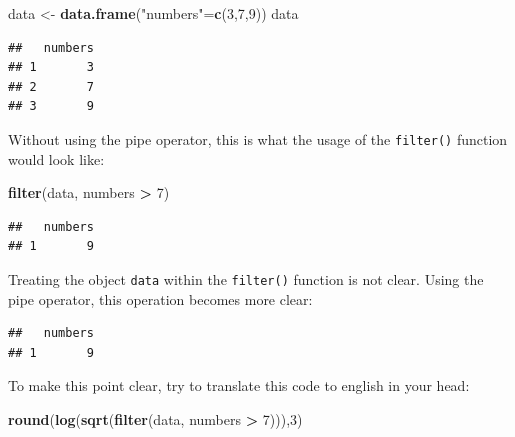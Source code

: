 \documentclass[
]{book}
\newenvironment{Shaded}{\begin{snugshade}}{\end{snugshade}}
\newcommand{\DecValTok}[1]{\textcolor[rgb]{0.00,0.00,0.81}{#1}}
\newcommand{\KeywordTok}[1]{\textcolor[rgb]{0.13,0.29,0.53}{\textbf{#1}}}
\newcommand{\NormalTok}[1]{#1}
\newcommand{\OperatorTok}[1]{\textcolor[rgb]{0.81,0.36,0.00}{\textbf{#1}}}
\newcommand{\StringTok}[1]{\textcolor[rgb]{0.31,0.60,0.02}{#1}}
\begin{document}
\begin{Shaded}
\begin{Highlighting}[]
\NormalTok{data <-}\StringTok{ }\KeywordTok{data.frame}\NormalTok{(}\StringTok{"numbers"}\NormalTok{=}\KeywordTok{c}\NormalTok{(}\DecValTok{3}\NormalTok{,}\DecValTok{7}\NormalTok{,}\DecValTok{9}\NormalTok{))}
\NormalTok{data}
\end{Highlighting}
\end{Shaded}

\begin{verbatim}
##   numbers
## 1       3
## 2       7
## 3       9
\end{verbatim}

Without using the pipe operator, this is what the usage of the \texttt{filter()} function would look like:

\begin{Shaded}
\begin{Highlighting}[]
\KeywordTok{filter}\NormalTok{(data, numbers }\OperatorTok{>}\StringTok{ }\DecValTok{7}\NormalTok{)}
\end{Highlighting}
\end{Shaded}

\begin{verbatim}
##   numbers
## 1       9
\end{verbatim}

Treating the object \texttt{data} within the \texttt{filter()} function is not clear.
Using the pipe operator, this operation becomes more clear:

\begin{Shaded}
\end{Shaded}

\begin{verbatim}
##   numbers
## 1       9
\end{verbatim}

To make this point clear, try to translate this code to english in your head:

\begin{Shaded}
\begin{Highlighting}[]
\KeywordTok{round}\NormalTok{(}\KeywordTok{log}\NormalTok{(}\KeywordTok{sqrt}\NormalTok{(}\KeywordTok{filter}\NormalTok{(data, numbers }\OperatorTok{>}\StringTok{ }\DecValTok{7}\NormalTok{))),}\DecValTok{3}\NormalTok{)}
\end{Highlighting}
\end{Shaded}
\end{document}
